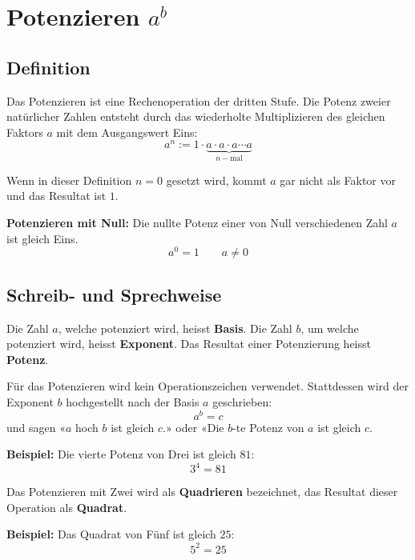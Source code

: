 \newpage
\section{Potenzieren $a^{b}$}

\subsection{Definition}

Das Potenzieren ist eine Rechenoperation der dritten Stufe. Die Potenz zweier natürlicher Zahlen entsteht durch das wiederholte Multiplizieren des gleichen Faktors $a$ mit dem Ausgangswert Eins:
\[
  a^{n} := 1\cdot\underbrace{a\cdot a\cdot a\cdots a}_{n-\text{mal}}
\]

Wenn in dieser Definition $n=0$ gesetzt wird, kommt $a$ gar nicht als Faktor vor und das Resultat ist $1$.
\begin{theorem}
  \textbf{Potenzieren mit Null:} Die nullte Potenz einer von Null verschiedenen Zahl $a$ ist gleich Eins.
  \[
    a^{0} = 1 \qquad a \ne 0
  \]
\end{theorem}

\subsection{Schreib- und Sprechweise}
Die Zahl $a$, welche potenziert wird, heisst \textbf{Basis}. Die Zahl $b$, um welche potenziert wird, heisst \textbf{Exponent}. Das Resultat einer Potenzierung heisst \textbf{Potenz}.

Für das Potenzieren wird kein Operationszeichen verwendet. Stattdessen wird der Exponent $b$ hochgestellt nach der Basis $a$ geschrieben:
\[
  a^{b} = c
\]
und sagen «$a$ hoch $b$ ist gleich $c$.» oder «Die $b$-te Potenz von $a$ ist gleich $c$.

\begin{example}
  \textbf{Beispiel:} Die vierte Potenz von Drei ist gleich $81$:
  \[
    3^{4} = 81
  \]
\end{example}

Das Potenzieren mit Zwei wird als \textbf{Quadrieren} bezeichnet, das Resultat dieser Operation als \textbf{Quadrat}.

\begin{example}
  \textbf{Beispiel:} Das Quadrat von Fünf ist gleich $25$:
  \[
    5^{2} = 25
  \]
\end{example}

